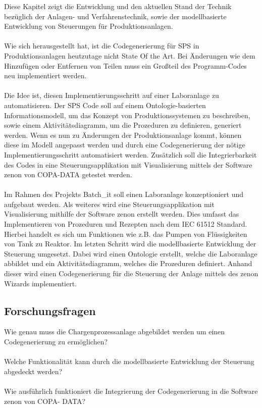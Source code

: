 Diese Kapitel zeigt die Entwicklung und den aktuellen Stand der Technik bezüglich der Anlagen- und Verfahrenstechnik, sowie der modellbasierte Entwicklung von Steuerungen für Produktionsanlagen. \\\\
Wie sich herausgestellt hat, ist die Codegenerierung für SPS in Produktionsanlagen heutzutage nicht State Of the Art. Bei Änderungen wie dem Hinzufügen oder Entfernen von Teilen muss ein Großteil des Programm-Codes neu implementiert werden. \\\\
Die Idee ist, diesen Implementierungsschritt auf einer Laboranlage zu automatisieren. Der SPS Code soll auf einem Ontologie-basierten Informationsmodell, um das Konzept von Produktionssystemen zu beschreiben, sowie einem Aktivitätsdiagramm, um die Prozeduren zu definieren, generiert werden. Wenn es nun zu Änderungen der Produktionsanlage kommt, können diese im Modell angepasst werden und durch eine Codegenerierung der nötige Implementierungsschritt automatisiert werden. Zusätzlich soll die Integrierbarkeit des Codes in eine Steuerungsapplikation mit Visualisierung mittels der Software zenon von COPA-DATA getestet werden.\\\\
Im Rahmen des Projekts Batch\_it soll einen Laboranlage konzeptioniert und aufgebaut werden. Als weiteres wird eine Steuerungsapplikation mit Visualisierung mithilfe der Software zenon erstellt werden. Dies umfasst das Implementieren von Prozeduren und Rezepten nach dem IEC 61512 Standard. Hierbei handelt es sich um Funktionen wie z.B. das Pumpen von Flüssigkeiten von Tank zu Reaktor. Im letzten Schritt wird die modellbasierte Entwicklung der Steuerung umgesetzt. Dabei wird einen Ontologie erstellt, welche die Laboranlage abbildet und ein Aktivitätsdiagramm, welches die Prozeduren definiert. Anhand dieser wird einen Codegenerierung für die Steuerung der Anlage mittels des zenon Wizards implementiert.
\subsection{Forschungsfragen}
Wie genau muss die Chargenprozessanlage abgebildet werden um einen Codegenerierung zu ermöglichen? \\\\
Welche Funktionalität kann durch die modellbasierte Entwicklung der Steuerung abgedeckt werden?\\\\
Wie ausführlich funktioniert die Integrierung der Codegenerierung in die Software zenon von COPA- DATA? 